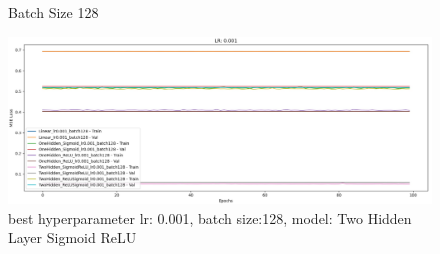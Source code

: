 \begin{figure}[!htbp]
\begin{minipage}{0.32\linewidth}
        \caption{Batch Size 128}
    \end{minipage}
\end{figure}

\begin{figure}[!htbp]
    \centering\includegraphics[width=1\linewidth]{crossentropy_best.jpg}
    \caption[short]{best hyperparameter lr: 0.001, batch size:128, model: Two Hidden Layer Sigmoid ReLU}
\end{figure}

